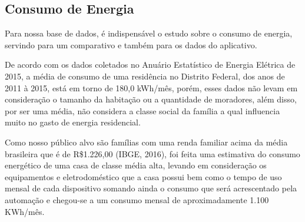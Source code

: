 \subsection{Consumo de Energia}
\par Para nossa base de dados, é indispensável o estudo sobre o consumo de energia, servindo para um comparativo e também para os dados do aplicativo.
\par De acordo com os dados coletados no Anuário Estatístico de Energia Elétrica de 2015, a média de consumo de uma residência no Distrito Federal, dos anos de 2011 à 2015, está em torno de 180,0 kWh/mês, porém, esses dados não levam em consideração o tamanho da habitação ou a quantidade de moradores, além disso, por ser uma média, não considera a classe social da família a qual influencia muito no gasto de energia residencial.
\par Como nosso público alvo são famílias com uma renda familiar acima da média brasileira que é de R\$1.226,00 (IBGE, 2016), foi feita uma estimativa do consumo energético de uma casa de classe média alta, levando em consideração os equipamentos e eletrodoméstico que a casa possui bem como o tempo de uso mensal de cada dispositivo somando ainda o consumo que será acrescentado pela automação e chegou-se a um consumo mensal de aproximadamente 1.100 KWh/mês.


